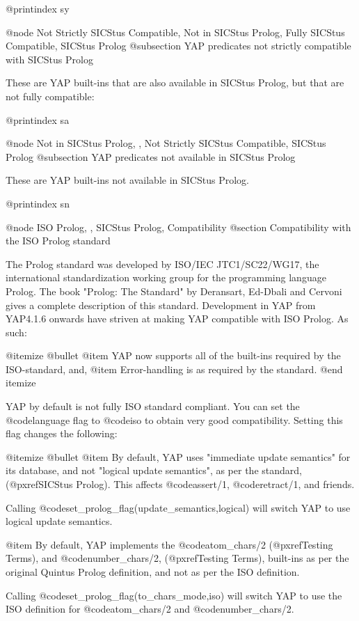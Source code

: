{{{{{{{{@printindex sy

@node Not Strictly SICStus Compatible, Not in SICStus Prolog, Fully SICStus Compatible, SICStus Prolog
@subsection YAP predicates not strictly compatible with SICStus Prolog

These are YAP built-ins that are also available in SICStus Prolog, but
that are not fully compatible:

@printindex sa

@node Not in SICStus Prolog, , Not Strictly SICStus Compatible, SICStus Prolog
@subsection YAP predicates not available in SICStus Prolog

These are YAP built-ins not available in SICStus Prolog.

@printindex sn


@node ISO Prolog, , SICStus Prolog, Compatibility
@section Compatibility with the ISO Prolog standard

The Prolog standard was developed by ISO/IEC JTC1/SC22/WG17, the
international standardization working group for the programming language
Prolog. The book "Prolog: The Standard" by Deransart, Ed-Dbali and
Cervoni gives a complete description of this standard. Development in
YAP from YAP4.1.6 onwards have striven at making YAP
compatible with ISO Prolog. As such:

@itemize @bullet
@item   YAP now supports all of the built-ins required by the
ISO-standard, and,
@item   Error-handling is as required by the standard.
@end itemize

YAP by default is not fully ISO standard compliant. You can set the 
@code{language} flag to @code{iso} to obtain very good
compatibility. Setting this flag changes the following:

@itemize @bullet
@item By default, YAP uses "immediate update semantics" for its
database, and not "logical update semantics", as per the standard,
(@pxref{SICStus Prolog}). This affects @code{assert/1},
@code{retract/1}, and friends.

Calling @code{set_prolog_flag(update_semantics,logical)} will switch
YAP to use logical update semantics.

@item By default, YAP implements the @code{atom_chars/2}
(@pxref{Testing Terms}), and @code{number_chars/2}, (@pxref{Testing
Terms}), built-ins as per the original Quintus Prolog definition, and
not as per the ISO definition.

Calling @code{set_prolog_flag(to_chars_mode,iso)} will switch
YAP to use the ISO definition for
@code{atom_chars/2} and @code{number_chars/2}.

}}}}}}}}
